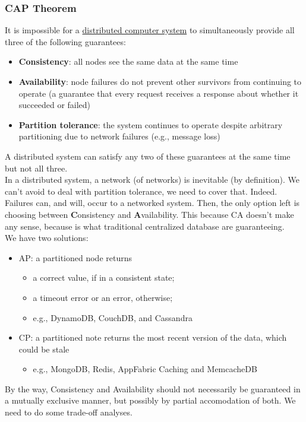 \documentclass[10pt,a4paper]{article}
\begin{document}
\subsubsection{CAP Theorem}
It is impossible for a \uline{distributed computer system} to simultaneously provide all three of the following guarantees:
\begin{itemize}
	\item \textbf{Consistency}: all nodes see the same data at the same time
	\item \textbf{Availability}: node failures do not prevent other survivors from continuing to operate (a guarantee that every request receives a response about whether it succeeded or failed)
	\item \textbf{Partition tolerance}: the system continues to operate despite arbitrary partitioning due to network failures (e.g., message loss)
\end{itemize}
A distributed system can satisfy any two of these guarantees at the same time but not all three. \\ 
In a distributed system, a network (of networks) is inevitable (by definition). We can't avoid to deal with partition tolerance, we need to cover that. Indeed. Failures can, and will, occur to a networked system. Then, the only option left is choosing between \textbf{C}onsistency and \textbf{A}vailability. This because CA doesn't make any sense, because is what traditional centralized database are guaranteeing. \\
We have two solutions:
\begin{itemize}
	\item AP: a partitioned node returns
	\begin{itemize}
		\item a correct value, if in a consistent state;
		\item a timeout error or an error, otherwise;
		\item e.g., DynamoDB, CouchDB, and Cassandra
	\end{itemize}
	\item CP: a partitioned note returns the most recent version of the data, which could be stale
	\begin{itemize}
		\item e.g., MongoDB, Redis, AppFabric Caching and MemcacheDB
	\end{itemize}
\end{itemize}
By the way, Consistency and Availability should not necessarily be guaranteed in a mutually exclusive manner, but possibly by partial accomodation of both. We need to do some trade-off analyses.
\end{document}
